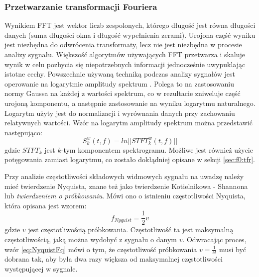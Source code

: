 \documentclass[12pt,a4paper,twoside]{mwart}
\begin{document}
\subsubsection{Przetwarzanie transformacji Fouriera}\label{sec:przetwarzanieFFT}
Wynikiem FFT jest wektor liczb zespolonych, którego długość jest równa długości danych (suma długości okna i długość wypełnienia zerami). Urojona część wyniku jest niezbędna do odwrócenia transformaty, lecz nie jest niezbędna w procesie analizy sygnału. Większość algorytmów używających FFT przetwarza i skaluje wynik w celu pozbycia się niepotrzebnych informacji jednocześnie uwypuklając istotne cechy. Powszechnie używaną techniką podczas analizy sygnałów jest operowanie na logarytmie amplitudy spektrum 
\cite[501-507]{Transcription:Talkin:RAPT}.
Polega to na zastosowaniu normy Gaussa na każdej z wartości spektrum, co w rezultacie zniweluje część urojoną komponentu, a następnie zastosowanie na wyniku logarytmu naturalnego. Logarytm użyty jest do normalizacji i wyrównania danych przy zachowaniu relatywnych wartości. Wzór na logarytm amplitudy spektrum można przedstawić następująco:
\begin{equation}\label{eq:logPowSpec}
S_k^w(t,f) = ln||STFT_k^w(t,f)||
\end{equation}
gdzie $STFT_k$ jest $k$-tym komponentem spektrogramu. Możliwe jest również użycie potęgowania zamiast logarytmu, co zostało dokłądniej opisane w sekcji \ref{sec:f0:tfr}.

Przy analizie częstotliwości składowych widmowych sygnału na uwadzę należy mieć twierdzenie Nyquista, znane też jako twierdzenie Kotielnikowa - Shannona lub \textit{twierdzeniem o próbkowaniu}. Mówi ono o istnieniu częstotliwości Nyquista, która opisana jest wzorem:
\begin{equation} \label{eq:NyquistFq}
  f_{Nyquist} = \frac{1}{2}v
\end{equation}
gdzie $v$ jest częstotliwością próbkowania. Częstotliwość ta jest maksymalną częstotliwością, jaką można wydobyć z sygnału o danym $v$. Odwracając proces, wzór \ref{eq:NyquistFq} mówi o tym, że częstotliwość próbkowania $v = \frac{1}{\delta t}$ musi być dobrana tak, aby była dwa razy większa od maksymalnej częstotliwości występującej w sygnale.
\end{document}
